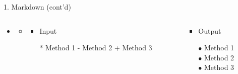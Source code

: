 \documentclass[14pt, aspectratio=169, sectionpage=simple, xclolor=table]{beamer}
\begin{document}
\begin{frame}[fragile, t]{1. Markdown (cont'd)}
\begin{itemize}
\item {}
\begin{itemize}
	\item[] 
	
	\begin{columns}
		\begin{column}{0.45\textwidth}
			\vspace{1cm}
			\begin{itemize}
				\item Input
				
				\begin{code11}
					* Method 1
					- Method 2
					+ Method 3
				\end{code11}
			\end{itemize}
		\end{column}%
		\hfill
		\begin{column}{0.45\textwidth}
			\vspace{1cm}
			\begin{itemize}
				\item Output
				
				$\bullet$ Method 1
				\\
				$\bullet$ Method 2
				\\
				$\bullet$ Method 3
				\\  
			\end{itemize}
		\end{column}%
	\end{columns}%
\end{itemize}
\end{itemize}




\end{frame}
\end{document}
